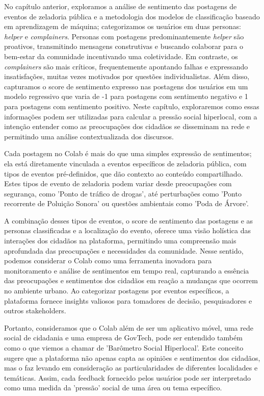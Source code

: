 No capítulo anterior, exploramos a análise de sentimento das postagens de eventos de zeladoria pública e a metodologia dos modelos de classificação baseado em aprendizagem de máquina; categorizamos os usuários em duas personas: \textit{helper} e \textit{complainers}. Personas com postagens predominantemente \textit{helper} são proativos, transmitindo mensagens construtivas e buscando colaborar para o bem-estar da comunidade incentivando uma coletividade. Em contraste, os \textit{complainers} são mais críticos, frequentemente apontando falhas e expressando insatisfações, muitas vezes motivados por questões individualistas. Além disso, capturamos o score de sentimento expresso nas postagens dos usuários em um modelo regressivo que varia de -1 para postagens com sentimento negativo e 1 para postagens com sentimento positivo. Neste capítulo, exploraremos como essas informações podem ser utilizadas para calcular a pressão social hiperlocal, com a intenção entender como as preocupações dos cidadãos se disseminam na rede e permitindo uma análise contextualizada dos discursos.

Cada postagem no Colab é mais do que uma simples expressão de sentimentos; ela está diretamente vinculada a eventos específicos de zeladoria pública, com tipos de eventos pré-definidos, que dão contexto ao conteúdo compartilhado. Estes tipos de evento de zeladoria podem variar desde preocupações com segurança, como 'Ponto de tráfico de drogas', até perturbações como 'Ponto recorrente de Poluição Sonora' ou questões ambientais como 'Poda de Árvore'. 

A combinação desses tipos de eventos, o score de sentimento das postagens e as personas classificadas e a localização do evento, oferece uma visão holística das interações dos cidadãos na plataforma, permitindo uma compreensão mais aprofundada das preocupações e necessidades da comunidade. Nesse sentido, podemos considerar o Colab como uma ferramenta inovadora para monitoramento e análise de sentimentos em tempo real, capturando a essência das preocupações e sentimentos dos cidadãos em reação a mudanças que ocorrem no ambiente urbano. Ao categorizar postagens por eventos específicos, a plataforma fornece insights valiosos para tomadores de decisão, pesquisadores e outros stakeholders.

Portanto, consideramos que o Colab além de ser um aplicativo móvel, uma rede social de cidadania e uma empresa de GovTech, pode ser entendido também como o que viemos a chamar de 'Barômetro Social Hiperlocal'. Este conceito sugere que a plataforma não apenas capta as opiniões e sentimentos dos cidadãos, mas o faz levando em consideração as particularidades de diferentes localidades e temáticas. Assim, cada feedback fornecido pelos usuários pode ser interpretado como uma medida da 'pressão' social de uma área ou tema específico. 

